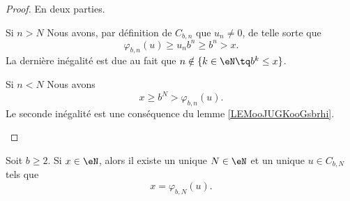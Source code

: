 \begin{proof}
	En deux parties.
	\begin{subproof}
		\item[Si \( n>N\)]
		Nous avons, par définition de \( C_{b,n}\) que \( u_n\neq 0\), de telle sorte que
		\begin{equation}
			\varphi_{b,n}(u)\geq u_nb^n\geq b^n>x .
		\end{equation}
		La dernière inégalité est due au fait que \( n\notin \{ k\in \eN\tq b^k\leq x \}\).
		\item[Si \( n<N\)]
		Nous avons
		\begin{equation}
			x\geq b^N> \varphi_{b,n}(u).
		\end{equation}
		Le seconde inégalité est une conséquence du lemme \ref{LEMooJUGKooGsbrhi}.
	\end{subproof}
\end{proof}

\begin{theorem}
	Soit \( b\geq 2\). Si \( x\in \eN\), alors il existe un unique \( N\in \eN\) et un unique \( u\in C_{b,N} \) tels que
	\begin{equation}
		x=\varphi_{b,N}(u).
	\end{equation}
\end{theorem}

